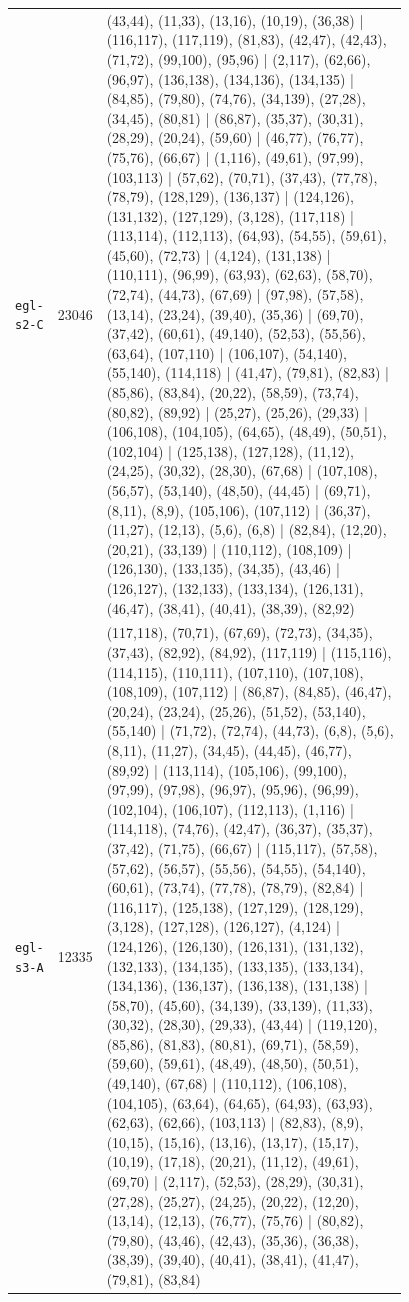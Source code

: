 \begin{landscape}
\begin{longtable}{lr>{\tiny\raggedright\arraybackslash}p{0.78\linewidth}}
\texttt{egl-s2-C} & 23046 & (43,44), (11,33), (13,16), (10,19), (36,38) | (116,117), (117,119), (81,83), (42,47), (42,43), (71,72), (99,100), (95,96) | (2,117), (62,66), (96,97), (136,138), (134,136), (134,135) | (84,85), (79,80), (74,76), (34,139), (27,28), (34,45), (80,81) | (86,87), (35,37), (30,31), (28,29), (20,24), (59,60) | (46,77), (76,77), (75,76), (66,67) | (1,116), (49,61), (97,99), (103,113) | (57,62), (70,71), (37,43), (77,78), (78,79), (128,129), (136,137) | (124,126), (131,132), (127,129), (3,128), (117,118) | (113,114), (112,113), (64,93), (54,55), (59,61), (45,60), (72,73) | (4,124), (131,138) | (110,111), (96,99), (63,93), (62,63), (58,70), (72,74), (44,73), (67,69) | (97,98), (57,58), (13,14), (23,24), (39,40), (35,36) | (69,70), (37,42), (60,61), (49,140), (52,53), (55,56), (63,64), (107,110) | (106,107), (54,140), (55,140), (114,118) | (41,47), (79,81), (82,83) | (85,86), (83,84), (20,22), (58,59), (73,74), (80,82), (89,92) | (25,27), (25,26), (29,33) | (106,108), (104,105), (64,65), (48,49), (50,51), (102,104) | (125,138), (127,128), (11,12), (24,25), (30,32), (28,30), (67,68) | (107,108), (56,57), (53,140), (48,50), (44,45) | (69,71), (8,11), (8,9), (105,106), (107,112) | (36,37), (11,27), (12,13), (5,6), (6,8) | (82,84), (12,20), (20,21), (33,139) | (110,112), (108,109) | (126,130), (133,135), (34,35), (43,46) | (126,127), (132,133), (133,134), (126,131), (46,47), (38,41), (40,41), (38,39), (82,92) \\[2pt]
\texttt{egl-s3-A} & 12335 & (117,118), (70,71), (67,69), (72,73), (34,35), (37,43), (82,92), (84,92), (117,119) | (115,116), (114,115), (110,111), (107,110), (107,108), (108,109), (107,112) | (86,87), (84,85), (46,47), (20,24), (23,24), (25,26), (51,52), (53,140), (55,140) | (71,72), (72,74), (44,73), (6,8), (5,6), (8,11), (11,27), (34,45), (44,45), (46,77), (89,92) | (113,114), (105,106), (99,100), (97,99), (97,98), (96,97), (95,96), (96,99), (102,104), (106,107), (112,113), (1,116) | (114,118), (74,76), (42,47), (36,37), (35,37), (37,42), (71,75), (66,67) | (115,117), (57,58), (57,62), (56,57), (55,56), (54,55), (54,140), (60,61), (73,74), (77,78), (78,79), (82,84) | (116,117), (125,138), (127,129), (128,129), (3,128), (127,128), (126,127), (4,124) | (124,126), (126,130), (126,131), (131,132), (132,133), (134,135), (133,135), (133,134), (134,136), (136,137), (136,138), (131,138) | (58,70), (45,60), (34,139), (33,139), (11,33), (30,32), (28,30), (29,33), (43,44) | (119,120), (85,86), (81,83), (80,81), (69,71), (58,59), (59,60), (59,61), (48,49), (48,50), (50,51), (49,140), (67,68) | (110,112), (106,108), (104,105), (63,64), (64,65), (64,93), (63,93), (62,63), (62,66), (103,113) | (82,83), (8,9), (10,15), (15,16), (13,16), (13,17), (15,17), (10,19), (17,18), (20,21), (11,12), (49,61), (69,70) | (2,117), (52,53), (28,29), (30,31), (27,28), (25,27), (24,25), (20,22), (12,20), (13,14), (12,13), (76,77), (75,76) | (80,82), (79,80), (43,46), (42,43), (35,36), (36,38), (38,39), (39,40), (40,41), (38,41), (41,47), (79,81), (83,84) \\[2pt]

\end{longtable}
\end{landscape}

